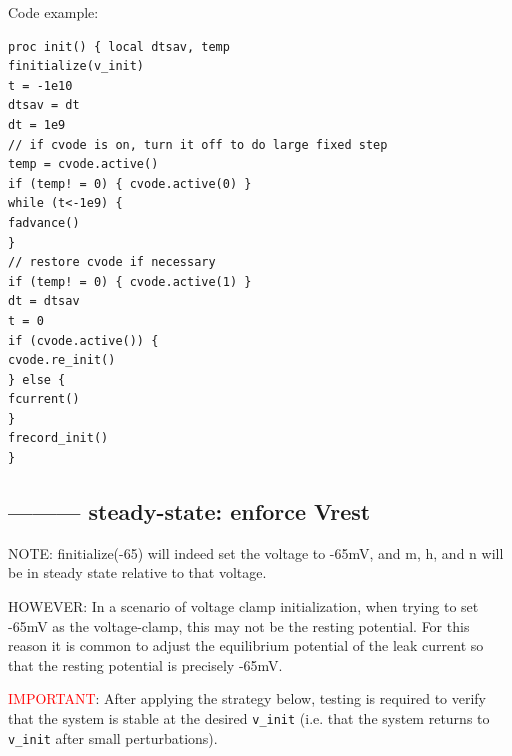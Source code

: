 Code example:
\begin{verbatim}
proc init() { local dtsav, temp
finitialize(v_init)
t = -1e10
dtsav = dt
dt = 1e9
// if cvode is on, turn it off to do large fixed step
temp = cvode.active()
if (temp! = 0) { cvode.active(0) }
while (t<-1e9) {
fadvance()
}
// restore cvode if necessary
if (temp! = 0) { cvode.active(1) }
dt = dtsav
t = 0
if (cvode.active()) {
cvode.re_init()
} else {
fcurrent()
}
frecord_init()
}
\end{verbatim}


\subsection{--------- steady-state: enforce Vrest}
\label{sec:resting-membrane-potential-numerics}

NOTE: finitialize(-65) will indeed set the voltage to -65mV, and m, h, and n
will be in steady state relative to that voltage. 

HOWEVER: In a scenario of voltage clamp initialization, when trying to set -65mV
as the voltage-clamp, this may not be the resting potential. For this reason it
is common to adjust the equilibrium potential of the leak current so that the
resting potential is precisely -65mV.


\textcolor{red}{IMPORTANT}: After applying the strategy below, testing is
required to verify that the system is stable at the desired \verb!v_init! (i.e.
that the system returns to \verb!v_init! after small perturbations).

